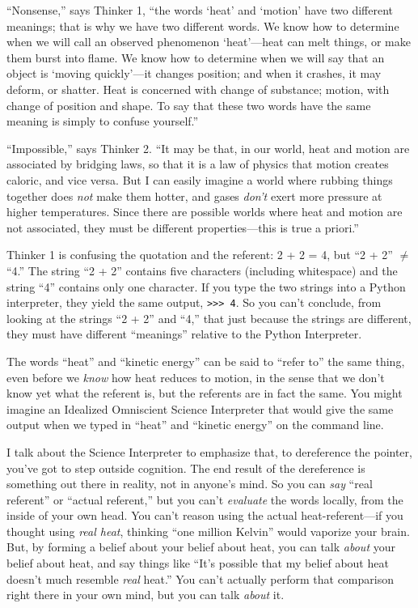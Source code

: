 {
 ``Nonsense,'' says Thinker 1,
``the words `heat' and
`motion' have two different meanings;
that is why we have two different words. We know how to determine when
we will call an observed phenomenon
`heat'---heat can melt things, or make
them burst into flame. We know how to determine when we will say that
an object is `moving quickly'---it
changes position; and when it crashes, it may deform, or shatter. Heat
is concerned with change of substance; motion, with change of position
and shape. To say that these two words have the same meaning is simply
to confuse yourself.''}

{
 ``Impossible,'' says Thinker 2.
``It may be that, in our world, heat and motion are
associated by bridging laws, so that it is a law of physics that motion
creates caloric, and vice versa. But I can easily imagine a world where
rubbing things together does \textit{not} make them hotter, and gases
\textit{don't} exert more pressure at higher
temperatures. Since there are possible worlds where heat and motion are
not associated, they must be different properties---this is true a
priori.''}

{
 Thinker 1 is confusing the quotation and the referent: 2 + 2 = 4,
but ``2 + 2'' ${\neq}$
``4.'' The string
``2 + 2'' contains five characters
(including whitespace) and the string
``4'' contains only one character.
If you type the two strings into a Python interpreter, they yield the
same output, \verb'>>> 4'. So you
can't conclude, from looking at the strings
``2 + 2'' and
``4,'' that just because the strings
are different, they must have different
``meanings'' relative to the Python
Interpreter.}

{
 The words ``heat'' and
``kinetic energy'' can be said to
``refer to'' the same thing, even
before we \textit{know} how heat reduces to motion, in the sense that
we don't know yet what the referent is, but the
referents are in fact the same. You might imagine an Idealized
Omniscient Science Interpreter that would give the same output when we
typed in ``heat'' and
``kinetic energy'' on the command
line.}

{
 I talk about the Science Interpreter to emphasize that, to
dereference the pointer, you've got to step outside
cognition. The end result of the dereference is something out there in
reality, not in anyone's mind. So you can \textit{say}
``real referent'' or
``actual referent,'' but you
can't \textit{evaluate} the words locally, from the
inside of your own head. You can't reason using the
actual heat-referent---if you thought using \textit{real heat},
thinking ``one million Kelvin''
would vaporize your brain. But, by forming a belief about your belief
about heat, you can talk \textit{about} your belief about heat, and say
things like ``It's possible that my
belief about heat doesn't much resemble \textit{real}
heat.'' You can't actually perform
that comparison right there in your own mind, but you can talk
\textit{about} it.}

